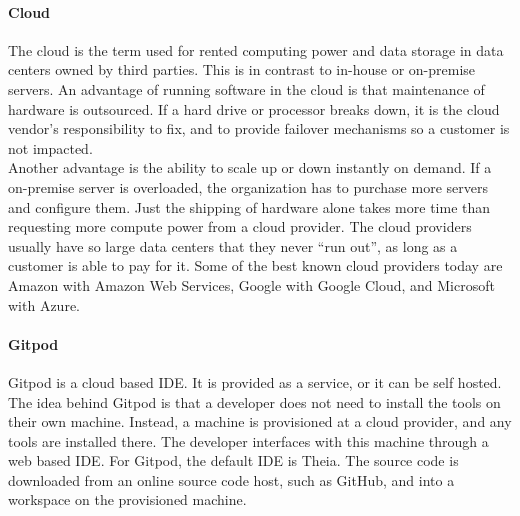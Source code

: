 \paragraph{Cloud}
The \gls{cloud} is the term used for rented computing power and data storage in data centers owned by third parties.
This is in contrast to in-house or on-premise servers.
An advantage of running software in the \gls{cloud} is that maintenance of hardware is outsourced.
If a hard drive or processor breaks down, it is the cloud vendor's responsibility to fix, and to provide failover mechanisms so a customer is not impacted.\\

Another advantage is the ability to scale up or down instantly on demand.
If a on-premise server is overloaded, the organization has to purchase more servers and configure them.
Just the shipping of hardware alone takes more time than requesting more compute power from a \gls{cloud} provider.
The cloud providers usually have so large data centers that they never ``run out'', as long as a customer is able to pay for it.
Some of the best known cloud providers today are Amazon with Amazon Web Services, Google with Google Cloud, and Microsoft with Azure.

\paragraph{Gitpod}
Gitpod is a \gls{cloud} based \acrfull{IDE}.
It is provided as a service, or it can be self hosted.
The idea behind \gls{Gitpod} is that a developer does not need to install the tools on their own machine.
Instead, a machine is provisioned at a cloud provider, and any tools are installed there.
The developer interfaces with this machine through a web based \acrshort{IDE}.
For Gitpod, the default \acrshort{IDE} is \gls{Theia}.
The source code is downloaded from an online source code host, such as \gls{GitHub}, and into a workspace on the provisioned machine. %
